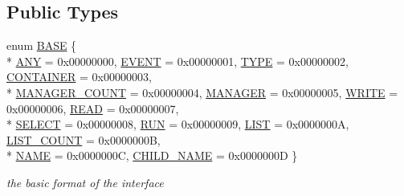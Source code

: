 \subsection*{Public Types}
\begin{DoxyCompactItemize}
\item 
enum \hyperlink{classcsad_1_1_base_object_a27d9db492c1a385aa4086da1824e2737}{B\-A\-S\-E} \{ \\*
\hyperlink{classcsad_1_1_base_object_a27d9db492c1a385aa4086da1824e2737a9ab99f6059466c7ce51004dd5938d35c}{A\-N\-Y} = 0x00000000, 
\hyperlink{classcsad_1_1_base_object_a27d9db492c1a385aa4086da1824e2737ad2103561ac9ca4b765a4c36914a7df02}{E\-V\-E\-N\-T} = 0x00000001, 
\hyperlink{classcsad_1_1_base_object_a27d9db492c1a385aa4086da1824e2737a6e23bbf77d9292172cc59b14d1cb4d04}{T\-Y\-P\-E} = 0x00000002, 
\hyperlink{classcsad_1_1_base_object_a27d9db492c1a385aa4086da1824e2737a43ab8e97faa9873019a54520280f4eb2}{C\-O\-N\-T\-A\-I\-N\-E\-R} = 0x00000003, 
\\*
\hyperlink{classcsad_1_1_base_object_a27d9db492c1a385aa4086da1824e2737a4ba0c7bad15c4e5eca45fb0e5ce830ca}{M\-A\-N\-A\-G\-E\-R\-\_\-\-C\-O\-U\-N\-T} = 0x00000004, 
\hyperlink{classcsad_1_1_base_object_a27d9db492c1a385aa4086da1824e2737a540e44bba71ec276cec84723ce1f6523}{M\-A\-N\-A\-G\-E\-R} = 0x00000005, 
\hyperlink{classcsad_1_1_base_object_a27d9db492c1a385aa4086da1824e2737af9ddc40b2b5ec6bb34f770700291fc08}{W\-R\-I\-T\-E} = 0x00000006, 
\hyperlink{classcsad_1_1_base_object_a27d9db492c1a385aa4086da1824e2737ac59c8af3c3e1a023abfeb4bd3eff7aa2}{R\-E\-A\-D} = 0x00000007, 
\\*
\hyperlink{classcsad_1_1_base_object_a27d9db492c1a385aa4086da1824e2737a1ad754d1312e455b8585419a33bba1bf}{S\-E\-L\-E\-C\-T} = 0x00000008, 
\hyperlink{classcsad_1_1_base_object_a27d9db492c1a385aa4086da1824e2737a10c28c9ee2a345bcc225baa078bf4752}{R\-U\-N} = 0x00000009, 
\hyperlink{classcsad_1_1_base_object_a27d9db492c1a385aa4086da1824e2737a6c87574035e30093ab61437967c0d61f}{L\-I\-S\-T} = 0x0000000\-A, 
\hyperlink{classcsad_1_1_base_object_a27d9db492c1a385aa4086da1824e2737a0fc048a20a58fb4f821beecee64ff361}{L\-I\-S\-T\-\_\-\-C\-O\-U\-N\-T} = 0x0000000\-B, 
\\*
\hyperlink{classcsad_1_1_base_object_a27d9db492c1a385aa4086da1824e2737a8e31010e573395e2cd42ae65e2f30d61}{N\-A\-M\-E} = 0x0000000\-C, 
\hyperlink{classcsad_1_1_base_object_a27d9db492c1a385aa4086da1824e2737a58634a1a515a3896051bf0e99a763253}{C\-H\-I\-L\-D\-\_\-\-N\-A\-M\-E} = 0x0000000\-D
 \}
\begin{DoxyCompactList}\small\item\em the basic format of the interface \end{DoxyCompactList}\end{DoxyCompactItemize}
